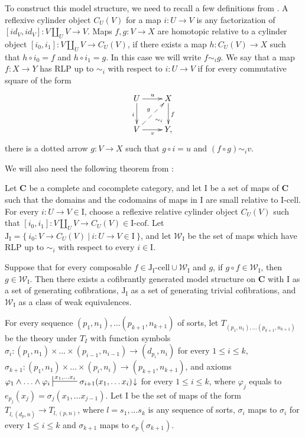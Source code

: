 \documentclass[reqno]{amsart}
\theoremstyle{definition}
\theoremstyle{remark}
\newcommand{\cat}[1]{\mathbf{#1}}
\newcommand{\C}{\cat{C}}
\newcommand{\we}{\mathcal{W}}
\newcommand{\I}{\mathrm{I}}
\newcommand{\J}{\mathrm{J}}
\newcommand{\class}[2]{#1\text{-}\mathrm{#2}}
\newcommand{\Icell}[1][\I]{\class{#1}{cell}}
\newcommand{\Icof}[1][\I]{\class{#1}{cof}}
\newcommand{\Jcell}[1][]{\Icell[\J#1]}
\newcommand{\cyli}{i}
\numberwithin{figure}{section}
\begin{document}
To construct this model structure, we need to recall a few definitions from \cite{f-model-structures}.
A reflexive cylinder object $C_U(V)$ for a map $i : U \to V$ is any factorization of $[id_V,id_V] : V \amalg_U V \to V$.
Maps $f,g : V \to X$ are homotopic relative to a cylinder object $[\cyli_0,\cyli_1] : V \amalg_U V \to C_U(V)$, if there exists a map $h : C_U(V) \to X$
such that $h \circ \cyli_0 = f$ and $h \circ \cyli_1 = g$.
In this case we will write $f \sim_i g$.
We say that a map $f : X \to Y$ has RLP up to $\sim_i$ with respect to $i : U \to V$ if for every commutative square of the form
\[ \xymatrix{ U \ar[r]^u \ar@{}[dr]|(.7){\sim_i} \ar[d]_i & X \ar[d]^f \\
              V \ar[r]_v \ar@{-->}[ur]^g                  & Y,
            } \]
there is a dotted arrow $g : V \to X$ such that $g \circ i = u$ and $(f \circ g) \sim_i v$.

We will also need the following theorem from \cite{f-model-structures}:
\begin{thm}
Let $\C$ be a complete and cocomplete category, and let $\I$ be a set of maps of $\C$
such that the domains and the codomains of maps in $\I$ are small relative to $\Icell$.
For every $i : U \to V \in \I$, choose a reflexive relative cylinder object $C_U(V)$
such that $[\cyli_0,\cyli_1] : V \amalg_U V \to C_U(V) \in \Icof$.
Let $\J_\I = \{\ \cyli_0 : V \to C_U(V)\ |\ i : U \to V \in \I \ \}$, and
let $\we_\I$ be the set of maps which have RLP up to $\sim_i$ with respect to every $i \in \I$.

Suppose that for every composable $f \in \Jcell[_\I] \cup \we_\I$ and $g$, if $g \circ f \in \we_\I$, then $g \in \we_\I$.
Then there exists a cofibrantly generated model structure on $\C$ with $\I$ as a set of generating cofibrations,
$\J_\I$ as a set of generating trivial cofibrations, and $\we_\I$ as a class of weak equivalences.
\end{thm}

For every sequence $(p_1,n_1), \ldots (p_{k+1},n_{k+1})$ of sorts, let $T_{(p_1,n_1), \ldots (p_{k+1},n_{k+1})}$ be the theory under $T_I$
with function symbols $\sigma_i : (p_1,n_1) \times \ldots \times (p_{i-1},n_{i-1}) \to (d_{p_i},n_i)$ for every $1 \leq i \leq k$,
$\sigma_{k+1} : (p_1,n_1) \times \ldots \times (p_i,n_i) \to (p_{k+1},n_{k+1})$,
and axioms $\varphi_1 \land \ldots \land \varphi_i \sststile{}{x_1, \ldots x_i} \sigma_{i+1}(x_1, \ldots x_i)\!\downarrow$ for every $1 \leq i \leq k$,
where $\varphi_j$ equals to $e_{p_j}(x_j) = \sigma_j(x_1, \ldots x_{j-1})$.
Let $\I$ be the set of maps of the form $T_{l, (d_p,n)} \to T_{l, (p,n)}$, where $l = s_1, \ldots s_k$ is any sequence of sorts,
$\sigma_i$ maps to $\sigma_i$ for every $1 \leq i \leq k$ and $\sigma_{k+1}$ maps to $e_p(\sigma_{k+1})$.
\end{document}

